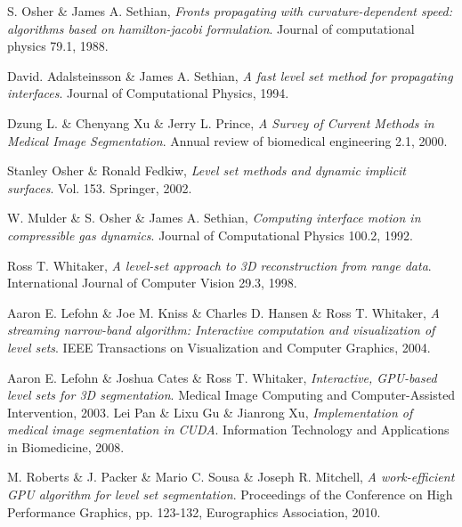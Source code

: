 \begin{thebibliography}{99}

	S. Osher \& James A. Sethian,
	\emph{Fronts propagating with curvature-dependent speed: algorithms based on hamilton-jacobi formulation}.
	Journal of computational physics 79.1,
	1988.
	
	David. Adalsteinsson \& James A. Sethian,
	\emph{A fast level set method for propagating interfaces}.
	Journal of Computational Physics,
	1994.

	Dzung L. \& Chenyang Xu \& Jerry L. Prince, 
	\emph{A Survey of Current Methods in Medical Image Segmentation}.
	Annual review of biomedical engineering 2.1,
	2000.

	Stanley Osher \& Ronald Fedkiw,
	\emph{Level set methods and dynamic implicit surfaces}.
	Vol. 153. Springer,
	2002.

	W. Mulder \& S. Osher \& James A. Sethian,
	\emph{Computing interface motion in compressible gas dynamics}.
	Journal of Computational Physics 100.2,
	1992.

	Ross T. Whitaker,
	\emph{A level-set approach to 3D reconstruction from range data}.
	International Journal of Computer Vision 29.3,
	1998.

	Aaron E. Lefohn \& Joe M. Kniss \& Charles D. Hansen \& Ross T. Whitaker,
	\emph{A streaming narrow-band algorithm: Interactive computation and visualization of level sets}.
	IEEE Transactions on Visualization and Computer Graphics,
	2004.

	Aaron E. Lefohn \& Joshua Cates \& Ross T. Whitaker,
	\emph{Interactive, GPU-based level sets for 3D segmentation}.
	 Medical Image Computing and Computer-Assisted Intervention,
	2003.
	Lei Pan \& Lixu Gu \& Jianrong Xu,
	\emph{Implementation of medical image segmentation in CUDA}.
	Information Technology and Applications in Biomedicine,
	2008.

	M. Roberts \& J. Packer \& Mario C. Sousa \& Joseph R. Mitchell,
	\emph{A work-efficient GPU algorithm for level set segmentation}.
	Proceedings of the Conference on High Performance Graphics, pp. 123-132, Eurographics Association,
	2010.
	

\end{thebibliography}
